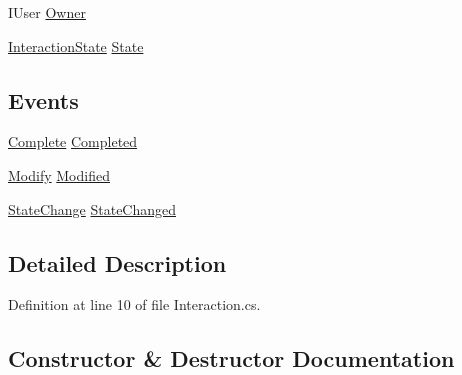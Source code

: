 \begin{DoxyCompactItemize}
\item 
I\+User \hyperlink{class_plex_byte_1_1_mo_cap_1_1_interactions_1_1_interaction_ae4c427e49c8dc9810bef3d951d00fb1c}{Owner}
\item 
\hyperlink{namespace_plex_byte_1_1_mo_cap_1_1_interactions_afcb673d9186608b6bd3b187179aedc8a}{Interaction\+State} \hyperlink{class_plex_byte_1_1_mo_cap_1_1_interactions_1_1_interaction_a6535ca18534c002687acfd47eb4c3688}{State}
\end{DoxyCompactItemize}
\subsection*{Events}
\begin{DoxyCompactItemize}
\item 
\hyperlink{namespace_plex_byte_1_1_mo_cap_1_1_interactions_ac81ac3321ab2b018c75ad2c18ec15b9e}{Complete} \hyperlink{class_plex_byte_1_1_mo_cap_1_1_interactions_1_1_interaction_a604db07ee0ef778ae93852ddcc9edf55}{Completed}
\item 
\hyperlink{namespace_plex_byte_1_1_mo_cap_1_1_interactions_a490186f613e46adce26244f3b2c78a58}{Modify} \hyperlink{class_plex_byte_1_1_mo_cap_1_1_interactions_1_1_interaction_afdbe5b52f84567a6ef45dab4f963431e}{Modified}
\item 
\hyperlink{namespace_plex_byte_1_1_mo_cap_1_1_interactions_af2ff213e81451f96fc74bfad114cecde}{State\+Change} \hyperlink{class_plex_byte_1_1_mo_cap_1_1_interactions_1_1_interaction_acd4488835055291a38a4a79af5266561}{State\+Changed}
\end{DoxyCompactItemize}


\subsection{Detailed Description}


Definition at line 10 of file Interaction.\+cs.



\subsection{Constructor \& Destructor Documentation}
